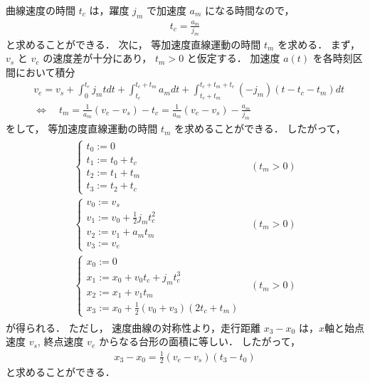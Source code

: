 \documentclass[a5paper]{ltjsarticle}
\begin{document}
曲線速度の時間 $t_c$ は，躍度 $j_m$ で加速度 $a_m$ になる時間なので，
\begin{align}
    t_c = \frac{a_m}{j_m}
\end{align}
と求めることができる．
次に，
等加速度直線運動の時間 $t_m$ を求める．
まず，
$v_s$ と $v_e$ の速度差が十分にあり， $t_m>0$ と仮定する．
加速度 $a(t)$ を各時刻区間において積分
\begin{align}
     &
    v_e
    =
    v_s + \int_{0}^{t_c}j_m t dt + \int_{t_c}^{t_c+t_m} a_m dt + \int_{t_c+t_m}^{t_c+t_m+t_c} (-j_m)(t-t_c-t_m) dt
    \\
     &
    \Leftrightarrow\quad
    t_m = \frac{1}{a_m}(v_e-v_s) - t_c
    = \frac{1}{a_m}(v_e-v_s) - \frac{a_m}{j_m}
\end{align}
をして，
等加速度直線運動の時間 $t_m$ を求めることができる．
したがって，
\begin{align}
    \begin{array}{ll}
        \left\{ \begin{array}{l}
            t_0 := 0         \\
            t_1 := t_0 + t_c \\
            t_2 := t_1 + t_m \\
            t_3 := t_2 + t_c
        \end{array} \right.
         &
        (t_m > 0)
        \\
        \left\{ \begin{array}{l}
            v_0 := v_s                        \\
            v_1 := v_0 + \frac{1}{2}j_m t_c^2 \\
            v_2 := v_1 + a_m t_m              \\
            v_3 := v_e
        \end{array} \right.
         &
        (t_m > 0)
        \\
        \left\{ \begin{array}{l}
            x_0 := 0                         \\
            x_1 := x_0 + v_0 t_c + j_m t_c^3 \\
            x_2 := x_1 + v_1 t_m             \\
            x_3 := x_0 + \frac{1}{2} (v_0+v_3) (2t_c+t_m)
        \end{array} \right.
         &
        (t_m > 0)
    \end{array}
\end{align}
が得られる．
ただし，
速度曲線の対称性より，走行距離 $x_3-x_0$ は，$x$軸と始点速度 $v_s$, 終点速度 $v_e$ からなる台形の面積に等しい．
したがって，
\begin{align}
    x_3-x_0 = \frac{1}{2}\left( v_e-v_s \right) \left( t_3-t_0 \right)
\end{align}
と求めることができる．
\end{document}
